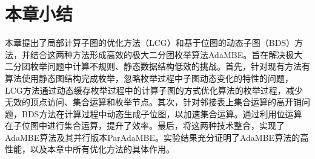 \section{本章小结}

本章提出了局部计算子图的优化方法（LCG）和基于位图的动态子图（BDS）方法，并结合这两种方法形成高效的极大二分团枚举算法AdaMBE。旨在解决极大二分团枚举问题中计算不规则、静态数据结构低效的挑战。首先，针对现有方法有算法使用静态图结构完成枚举，忽略枚举过程中子图动态变化的特性的问题，LCG方法通过动态缓存枚举过程中的计算子图的方式优化算法的枚举过程，减少无效的顶点访问、集合运算和枚举节点。其次，针对邻接表上集合运算的高开销问题，BDS方法在计算过程中动态生成子位图，以加速集合运算。通过利用位运算在子位图中进行集合运算，提升了效率。最后，将这两种技术整合，实现了AdaMBE算法及其并行版本ParAdaMBE。实验结果充分证明了AdaMBE算法的高性能，以及本章中所有优化方法的具体作用。